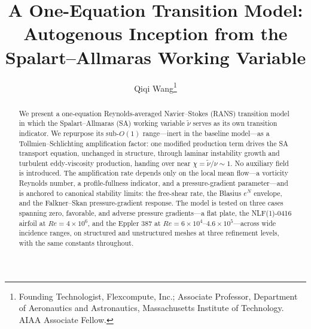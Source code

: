 \documentclass[journal]{new-aiaa}
\title{A One-Equation Transition Model: Autogenous Inception from the
Spalart--Allmaras Working Variable}
\author[1,2]{Qiqi Wang\footnote{Founding Technologist, Flexcompute, Inc.;
Associate Professor, Department of Aeronautics and Astronautics, Massachusetts
Institute of Technology. AIAA Associate Fellow.}}
\affil[1]{Flexcompute, Inc.}
\affil[2]{Department of Aeronautics and Astronautics, Massachusetts Institute of Technology}
\begin{document}
\maketitle

\begin{abstract}
We present a one-equation Reynolds-averaged Navier--Stokes (RANS) transition
model in which the Spalart--Allmaras (SA) working variable $\tilde\nu$ serves as
its own transition indicator. We repurpose its sub-$O(1)$ range---inert in the
baseline model---as a Tollmien--Schlichting amplification factor: one modified
production term drives the SA transport equation, unchanged in structure,
through laminar instability growth and turbulent eddy-viscosity production,
handing over near $\chi\!=\!\tilde\nu/\nu\!\sim\!1$. No auxiliary field is
introduced. The amplification rate depends only on the local mean
flow---a vorticity Reynolds number, a profile-fullness indicator, and a
pressure-gradient parameter---and
is anchored to canonical stability limits: the free-shear rate, the
Blasius $e^N$ envelope, and the Falkner--Skan pressure-gradient response. The
model is tested on three cases spanning zero, favorable, and adverse
pressure gradients---a flat plate, the NLF(1)-0416 airfoil at
$Re\!=\!4\!\times\!10^6$, and the Eppler 387 at
$Re\!=\!6\!\times\!10^4$--$4.6\!\times\!10^5$---across wide incidence ranges,
on structured and unstructured meshes at three refinement levels, with
the same constants throughout.
\end{abstract}
\end{document}
